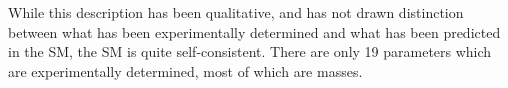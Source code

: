 While this description has been qualitative, and has not drawn distinction between what has been experimentally determined and what has been predicted in the SM, the SM is quite self-consistent. There are only 19 parameters which are experimentally determined, most of which are masses.




